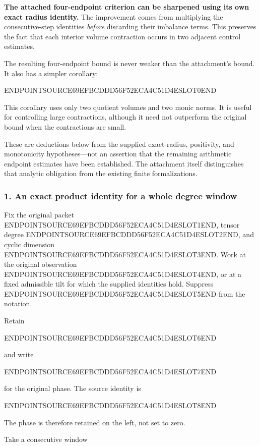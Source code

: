 \textbf{The attached four-endpoint criterion can be sharpened using its own exact radius identity.} The improvement comes from multiplying the consecutive-step identities \emph{before} discarding their imbalance terms. This preserves the fact that each interior volume contraction occurs in two adjacent control estimates.

The resulting four-endpoint bound is never weaker than the attachment's bound. It also has a simpler corollary:

ENDPOINTSOURCE69EFBCDDD56F52ECA4C51D4ESLOT0END

This corollary uses only two quotient volumes and two monic norms. It is useful for controlling large contractions, although it need not outperform the original bound when the contractions are small.

These are deductions below from the supplied exact-radius, positivity, and monotonicity hypotheses---not an assertion that the remaining arithmetic endpoint estimates have been established. The attachment itself distinguishes that analytic obligation from the existing finite formalizations.

\subsubsection{1. An exact product identity for a whole degree window}\label{endpoint-user_product_original--an-exact-product-identity-for-a-whole-degree-window}

Fix the original packet ENDPOINTSOURCE69EFBCDDD56F52ECA4C51D4ESLOT1END, tensor degree ENDPOINTSOURCE69EFBCDDD56F52ECA4C51D4ESLOT2END, and cyclic dimension ENDPOINTSOURCE69EFBCDDD56F52ECA4C51D4ESLOT3END. Work at the original observation ENDPOINTSOURCE69EFBCDDD56F52ECA4C51D4ESLOT4END, or at a fixed admissible tilt for which the supplied identities hold. Suppress ENDPOINTSOURCE69EFBCDDD56F52ECA4C51D4ESLOT5END from the notation.

Retain

ENDPOINTSOURCE69EFBCDDD56F52ECA4C51D4ESLOT6END

and write

ENDPOINTSOURCE69EFBCDDD56F52ECA4C51D4ESLOT7END

for the original phase. The source identity is

ENDPOINTSOURCE69EFBCDDD56F52ECA4C51D4ESLOT8END

The phase is therefore retained on the left, not set to zero.

Take a consecutive window

